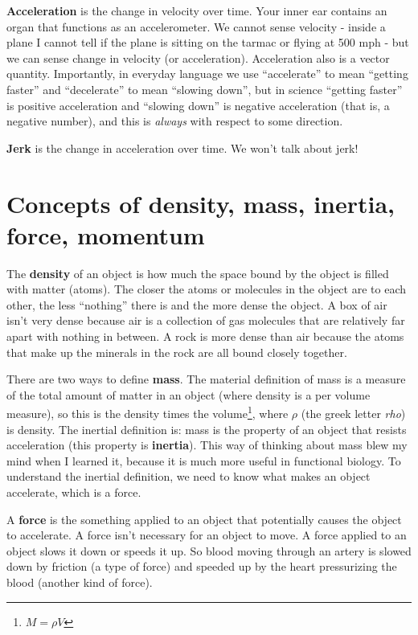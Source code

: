 \documentclass[]{book}
\let\rmarkdownfootnote\footnote%
\def\footnote{\protect\rmarkdownfootnote}
\begin{document}
\textbf{Acceleration} is the change in velocity over time. Your inner
ear contains an organ that functions as an accelerometer. We cannot
sense velocity - inside a plane I cannot tell if the plane is sitting on
the tarmac or flying at 500 mph - but we can sense change in velocity
(or acceleration). Acceleration also is a vector quantity. Importantly,
in everyday language we use ``accelerate'' to mean ``getting faster''
and ``decelerate'' to mean ``slowing down'', but in science ``getting
faster'' is positive acceleration and ``slowing down'' is negative
acceleration (that is, a negative number), and this is \emph{always}
with respect to some direction.

\textbf{Jerk} is the change in acceleration over time. We won't talk
about jerk!

\section{Concepts of density, mass, inertia, force,
momentum}\label{concepts-of-density-mass-inertia-force-momentum}

The \textbf{density} of an object is how much the space bound by the
object is filled with matter (atoms). The closer the atoms or molecules
in the object are to each other, the less ``nothing'' there is and the
more dense the object. A box of air isn't very dense because air is a
collection of gas molecules that are relatively far apart with nothing
in between. A rock is more dense than air because the atoms that make up
the minerals in the rock are all bound closely together.

There are two ways to define \textbf{mass}. The material definition of
mass is a measure of the total amount of matter in an object (where
density is a per volume measure), so this is the density times the
volume\footnote{\(M=\rho V\)}, where \(\rho\) (the greek letter
\emph{rho}) is density. The inertial definition is: mass is the property
of an object that resists acceleration (this property is
\textbf{inertia}). This way of thinking about mass blew my mind when I
learned it, because it is much more useful in functional biology. To
understand the inertial definition, we need to know what makes an object
accelerate, which is a force.

A \textbf{force} is the something applied to an object that potentially
causes the object to accelerate. A force isn't necessary for an object
to move. A force applied to an object slows it down or speeds it up. So
blood moving through an artery is slowed down by friction (a type of
force) and speeded up by the heart pressurizing the blood (another kind
of force).
\end{document}
